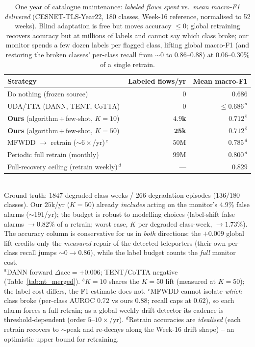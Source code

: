 \begin{table}[t]
\centering
\caption{One year of catalogue maintenance: \emph{labeled flows spent} vs.\
\emph{mean macro-F1 delivered} (CESNET-TLS-Year22, 180 classes, Week-16 reference,
normalised to 52 weeks). Blind adaptation is free but moves accuracy $\le 0$; global
retraining recovers accuracy but at millions of labels and cannot say which class
broke; our monitor spends a few dozen labels per flagged class, lifting global
macro-F1 (and restoring the broken classes' per-class recall from ${\sim}0$ to
$0.86$--$0.88$) at $0.06$--$0.30\%$ of a single retrain.}
\label{tab:labelcost}
\setlength{\tabcolsep}{4pt}
\begin{tabular}{@{}lrr@{}}
\hline
\textbf{Strategy} & \textbf{Labeled flows/yr} & \textbf{Mean macro-F1} \\
\hline
Do nothing (frozen source)            & $0$      & $0.686$ \\
UDA/TTA (DANN, TENT, CoTTA)            & $0$      & $\le 0.686^{\,a}$ \\
\textbf{Ours} (algorithm\,+\,few-shot, $K{=}10$) & $\mathbf{4.9}$\textbf{k} & $\mathbf{0.712}^{\,b}$ \\
\textbf{Ours} (algorithm\,+\,few-shot, $K{=}50$) & $\mathbf{25}$\textbf{k}  & $\mathbf{0.712}^{\,b}$ \\
MFWDD $\rightarrow$ retrain (${\sim}6\times$/yr)$^{\,c}$ & $50$M & $0.785^{\,d}$ \\
Periodic full retrain (monthly)       & $99$M    & $0.800^{\,d}$ \\
Full-recovery ceiling (retrain weekly)$^{\,d}$ & ---     & $0.829$ \\
\hline
\end{tabular}
\\[2pt]
\footnotesize{Ground truth: $1847$ degraded class-weeks / $266$ degradation episodes
($136/180$ classes). Our $25$k/yr ($K{=}50$) already \emph{includes} acting on the
monitor's $4.9\%$ false alarms (${\sim}191$/yr); the budget is robust to modelling
choices (label-shift false alarms $\to0.82\%$ of a retrain; worst case, $K$ per
degraded class-week, $\to1.73\%$). The accuracy column is conservative for us in
\emph{both} directions: the $+0.009$ global lift credits only the \emph{measured}
repair of the detected teleporters (their own per-class recall jumps ${\sim}0\to0.86$),
while the label budget counts the \emph{full} monitor cost.\\
$^{a}$DANN forward $\Delta\text{acc}{=}{+}0.006$; TENT/CoTTA negative (Table~\ref{tab:nt_merged}).
$^{b}$$K{=}10$ shares the $K{=}50$ lift (measured at $K{=}50$); the label cost differs, the F1 estimate does not.
$^{c}$MFWDD cannot isolate \emph{which} class broke (per-class AUROC $0.72$ vs ours $0.88$;
recall caps at $0.62$), so each alarm forces a full retrain; as a global weekly drift
detector its cadence is threshold-dependent (order $5$--$10\times$/yr).
$^{d}$Retrain accuracies are \emph{idealised} (each retrain recovers to ${\sim}$peak and
re-decays along the Week-16 drift shape) -- an optimistic upper bound for retraining.}
\end{table}
